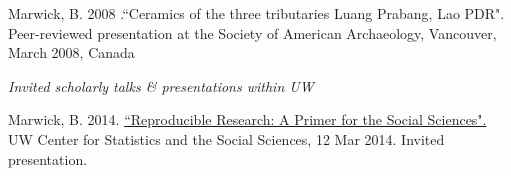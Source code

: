 \ind Marwick, B. 2008 .``Ceramics of the three tributaries Luang Prabang, Lao PDR". Peer-reviewed presentation at the  Society of American Archaeology, Vancouver, March 2008, Canada

 \bigskip
 
 

\noindent\emph{Invited scholarly talks \& presentations within UW \vspace{0.01in}}

\medskip

\ind Marwick, B. 2014. {\href{https://github.com/benmarwick/CSSS-Primer-Reproducible-Research}{``Reproducible Research: A Primer for the Social Sciences".}}  UW Center for Statistics and the Social Sciences, 12 Mar 2014. Invited presentation.

